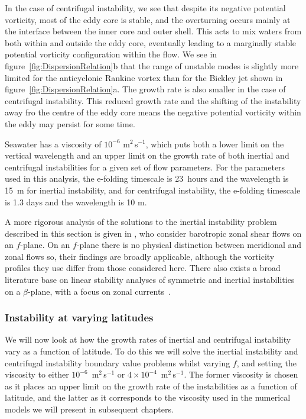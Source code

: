 In the case of centrifugal instability, we see that despite its negative potential vorticity, most of the eddy core is stable, and the overturning occurs mainly at the interface between the inner core and outer shell. This acts to mix waters from both within and outside the eddy core, eventually leading to a marginally stable potential vorticity configuration within the flow. We see in figure~\ref{fig:DispersionRelation}b that the range of unstable modes is slightly more limited for the anticyclonic Rankine vortex than for the Bickley jet shown in figure~\ref{fig:DispersionRelation}a. The growth rate is also smaller in the case of centrifugal instability. This reduced growth rate and the shifting of the instability away fro the centre of the eddy core means the negative potential vorticity within the eddy may persist for some time.

Seawater has a viscosity of $10^{-6}$ m$^{2}$\,s$^{-1}$, which puts both a lower limit on the vertical wavelength and an upper limit on the growth rate of both inertial and centrifugal instabilities for a given set of flow parameters. For the parameters used in this analysis, the e-folding timescale is 23~hours and the wavelength is 15~m for inertial instability, and for centrifugal instability, the e-folding timescale is 1.3 days and the wavelength is 10 m. 

A more rigorous analysis of the solutions to the inertial instability problem described in this section is given in \citet{Plougonven2009}, who consider barotropic zonal shear flows on an $f$-plane. On an $f$-plane there is no physical distinction between meridional and zonal flows so, their findings are broadly applicable, although the vorticity profiles they use differ from those considered here. There also exists a broad literature base on linear stability analyses of symmetric and inertial instabilities on a $\beta$-plane, with a focus on zonal currents~\citep[e.g.][]{Hua1997, Griffiths2003, Ribstein2014, Kloosterziel2017}.

\subsubsection{Instability at varying latitudes}
We will now look at how the growth rates of inertial and centrifugal instability vary as a function of latitude. To do this we will solve the inertial instability and centrifugal instability boundary value problems whilst varying $f$, and setting the viscosity to either $10^{-6}$~m$^{2}\,$s$^{-1}$ or $4 \times 10^{-4}$~m$^{2}\,$s$^{-1}$. The former viscosity is chosen as it places an upper limit on the growth rate of the instabilities as a function of latitude, and the latter as it corresponds to the viscosity used in the numerical models we will present in subsequent chapters.

